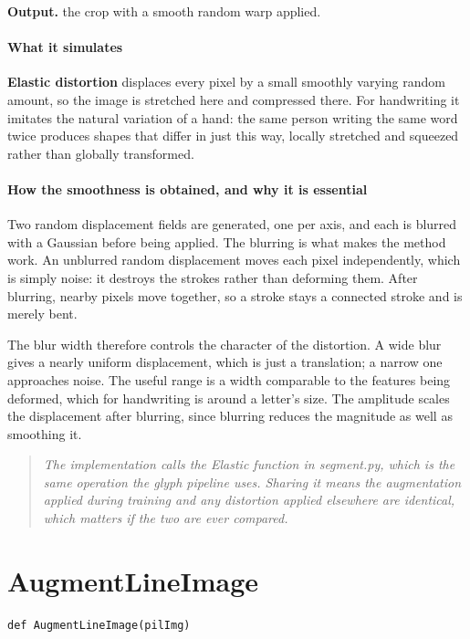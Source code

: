 \noindent\textbf{Output.} the crop with a smooth random warp applied.


\paragraph{What it simulates}
\textbf{Elastic distortion} \cite{simard2003} displaces every pixel by a small smoothly varying random amount, so the image is stretched here and compressed there. For handwriting it imitates the natural variation of a hand: the same person writing the same word twice produces shapes that differ in just this way, locally stretched and squeezed rather than globally transformed.


\paragraph{How the smoothness is obtained, and why it is essential}
Two random displacement fields are generated, one per axis, and each is blurred with a Gaussian before being applied. The blurring is what makes the method work. An unblurred random displacement moves each pixel independently, which is simply noise: it destroys the strokes rather than deforming them. After blurring, nearby pixels move together, so a stroke stays a connected stroke and is merely bent.

The blur width therefore controls the character of the distortion. A wide blur gives a nearly uniform displacement, which is just a translation; a narrow one approaches noise. The useful range is a width comparable to the features being deformed, which for handwriting is around a letter's size. The amplitude scales the displacement after blurring, since blurring reduces the magnitude as well as smoothing it.


\begin{quote}\small\itshape The implementation calls the Elastic function in segment.py, which is the same operation the glyph pipeline uses. Sharing it means the augmentation applied during training and any distortion applied elsewhere are identical, which matters if the two are ever compared.\end{quote}

\section{AugmentLineImage}
\begin{lstlisting}[style=sig]
def AugmentLineImage(pilImg)
\end{lstlisting}

